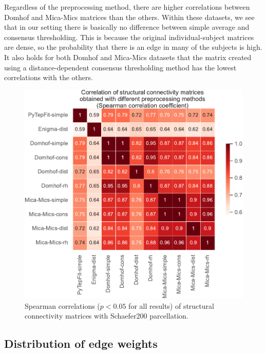 Regardless of the preprocessing method, there are higher correlations between Domhof and Mica-Mics matrices than the others. Within these datasets, we see that in our setting there is basically no difference between simple average and consensus thresholding. This is because the original individual-subject matrices are dense, so the probability that there is an edge in many of the subjects is high. It also holds for both Domhof and Mica-Mics datasets that the matrix created using a distance-dependent consensus thresholding method has the lowest correlations with the others.

\begin{figure}[p]
  \begin{center}
    \includegraphics[width=\textwidth]{images/nootebook_generated/sc_comparison/schaefer/5/0.25/correlations_all_matrices_Spearman.pdf}
  \end{center}
  \caption[Correlations of SC matrices (Schaefer200 parcellation)]{Spearman correlations ($p<0.05$ for all results) of structural connectivity matrices with Schaefer200 parcellation. }
  \label{fig:sc_correlations}
\end{figure}


\subsection{Distribution of edge weights}

